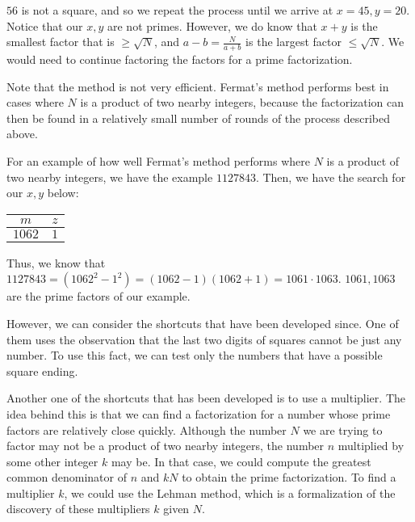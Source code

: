 \documentclass{article}
\begin{document}
$56$ is not a square, and so we repeat the process until we arrive at $x = 45, y = 20$. Notice that our $x,y$ are
not primes. However, we do know that $x+y$ is the smallest factor that is $\geq \sqrt{N}$, and $a-b = \frac{N}{a+b}$
is the largest factor $\leq \sqrt{N}$. We would need to continue factoring the factors for a prime factorization.


\par Note that the method is not very efficient. Fermat's method performs best in cases where $N$ is a product of
two nearby integers, because the factorization can then be found in a relatively small number of rounds of the
process described above.

\par For an example of how well Fermat's method performs where $N$ is a product of two nearby integers, we have
the example $1127843$. Then, we have the search for our $x,y$ below:
\begin{center}
    \begin{tabular}{ | c | c | }
        \hline
        $m$ & $z$ \\ \hline
        $1062$ & $1$ \\
        \hline
    \end{tabular}
\end{center}
\par Thus, we know that $1127843=(1062^2-1^2)=(1062-1)(1062+1)=1061\cdot1063$. $1061,1063$ are the prime factors
of our example.

\par However, we can consider the shortcuts that have been developed since. One of them uses the observation that
the last two digits of squares cannot be just any number. To use this fact, we can test only the numbers that have a
possible square ending.

\par Another one of the shortcuts that has been developed is to use a multiplier. The idea behind this is that
we can find a factorization for a number whose prime factors are relatively close quickly. Although the number $N$ we
are trying to factor may not be a product of two nearby integers, the number $n$ multiplied by some other integer $k$
may be. In that case, we could compute the greatest common denominator of $n$ and $kN$ to obtain the prime factorization. To find a multiplier
$k$, we could use the Lehman method, which is a formalization of the discovery of these multipliers $k$ given $N$.


\end{document}
